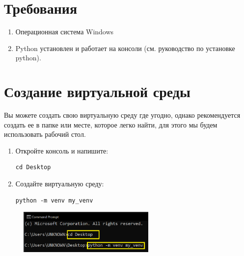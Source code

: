 \documentclass[12pt]{article}
\begin{document}
\setcounter{page}{1}%
\section{Требования}
\begin{enumerate}
	\item Операционная система Windows
	\item Python установлен и работает на консоли (см. руководство по установке python).
\end{enumerate}

\section{Создание виртуальной среды}
Вы можете создать свою виртуальную среду где угодно, однако рекомендуется создать ее в папке или месте, которое легко найти,
для этого мы будем использовать рабочий стол.

\begin{enumerate}
	\item Откройте консоль и напишите:

	      \begin{lstlisting}[caption=\phantom{},style=conlst,label={lst:enter_desktop}]
cd Desktop
			\end{lstlisting}

	\item Создайте виртуальную среду:

	      \begin{lstlisting}[caption=\phantom{},style=conlst,label={lst:create_venv}]
python -m venv my_venv
			\end{lstlisting}

\end{enumerate}

\begin{figure}[H]
	\centering
	\includegraphics[width=0.6\textwidth ,keepaspectratio]{imgs/venv.png}
	\caption{}
\end{figure}
\end{document}
